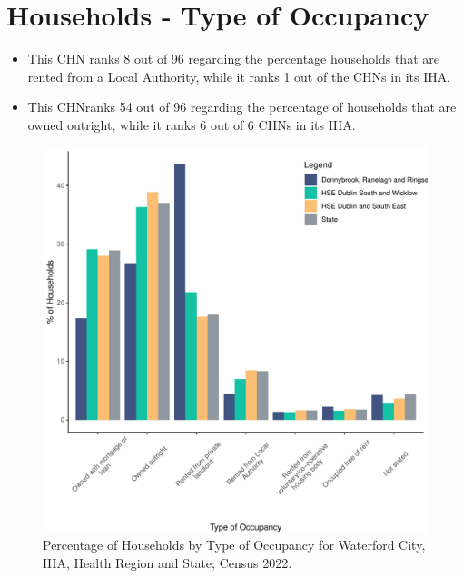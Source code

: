 \documentclass{article}
\begin{document}
\section{Households - Type of Occupancy}\label{sect:Households}
\begin{itemize}
\item This CHN ranks  8 out of 96 regarding the percentage households that are rented from a Local Authority, while it ranks  1 out of the CHNs in its IHA. 
\item This CHNranks  54 out of 96 regarding the percentage of households that are owned outright, while it ranks   6 out of 6 CHNs in its IHA.
\end{itemize}
\begin{figure}[H]
	\centering
	\includegraphics[width = 140mm]{../figures/HouseholdsED.pdf}
	\caption{Percentage of Households by Type of Occupancy for Waterford City, IHA, Health Region and State; Census 2022.}
	\label{fig:vbnv}
	\end{figure}
\end{document}
